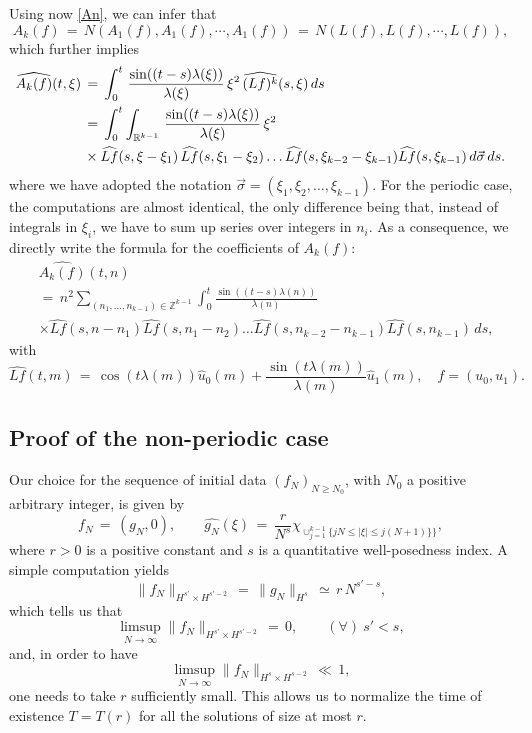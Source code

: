 \documentclass{amsart}
\newcommand{\wh}{\widehat}
\begin{document}
Using now \eqref{An}, we can infer that
\[
A_k(f)\,=\,N(A_1(f),A_1(f), \cdots, A_{1}(f))\,=\,N(L(f),L(f), \cdots, L(f)),\]
which further implies
\begin{equation}
\aligned
\widehat{A_{k}(f)}(t,\xi)\,&=\,\int_0^t\,\frac{\sin((t-s) \lambda(\xi))}{\lambda(\xi)}\, \xi^2\, \widehat{(Lf)^k}(s,\xi)\,ds\\
&=\,\int_0^t \int_{\mathbb{R}^{k-1}}\,\frac{\sin((t-s) \lambda(\xi))}{\lambda(\xi)}\, \xi^2\, 
\\
& \times \widehat{Lf}(s,\xi-\xi_{1})\,\widehat{Lf}(s,\xi_{1} - \xi_{2})\dots \wh{Lf}(s, \xi_{k-2}-\xi_{k-1})\wh{Lf}(s, \xi_{k-1}) \,d \vec{\sigma} \,ds.\endaligned
\label{A2f}
\end{equation}
where we have adopted the notation
$\vec{\sigma} = (\xi_{1}, \xi_{2}, \dots, \xi_{k-1})$.
For the periodic case, the computations are almost identical, the only difference being that, instead of integrals in $\xi_{i}$, we have to sum up series over integers in $n_{i}$. As a consequence, we directly write the formula for the coefficients of $A_{k}(f)$:
\begin{equation}
  \begin{split}
&  \widehat{A_{k}(f)}(t,n)\, 
\\
& = \, n^2 \sum_{(n_{1}, \ldots, n_{k-1})\in\mathbb{Z}^{k-1}} \int_0^t \frac{\sin((t-s) \lambda(n))}{\lambda(n)} 
\\
& \times \widehat{Lf}(s,n - n_{1}) \wh{Lf}(s, n_{1} - n_{2}) \dots \wh{Lf}(s, n_{k-2} - n_{k-1})
\wh{Lf}(s, n_{k-1})
\,ds,
\label{A2p}
\end{split}
\end{equation}
with
\[
\widehat{Lf}(t,m)\,=\,\cos(t \lambda(m)) \hat{u}_0(m)+\frac{\sin(t \lambda(m))}{\lambda(m)} \hat{u}_1(m),\quad f=(u_0,u_1).\]


\subsection{Proof of the non-periodic case} Our choice for the sequence of initial data $(f_N)_{N\geq N_0}$, with $N_0$ a positive arbitrary integer, is given by
\begin{equation}
f_N\,=\,(g_N, 0), \qquad \widehat{g_N}(\xi)\,=\,\frac{r}{N^s} \chi_{\cup_{j=1}^{k-1}\{jN \leq |\xi| \leq j(N + 1)\}\}},
\label{fn}
\end{equation}
where $r>0$ is a positive constant and $s$ is a quantitative well-posedness index. A simple computation yields
\begin{equation}
\|f_N\|_{H^{s'}\times H^{s'-2}}\,=\,\|g_N\|_{H^s}\,\simeq\,r\,N^{s'-s},
\label{hsfn}
\end{equation}
which tells us that
\[
\limsup_{N\to \infty} \|f_N\|_{H^{s'} \times H^{s' -2}}\,=\,0, \qquad (\forall)\ s'<s, 
\]
and, in order to have 
\[
\limsup_{N\to \infty} \|f_N\|_{H^s \times H^{s -2}}\,\ll\,1,
\]
one needs to take $r$ sufficiently small. This allows us to normalize the time of existence $T=T(r)$ for all the solutions of size at most $r$.
\end{document}
